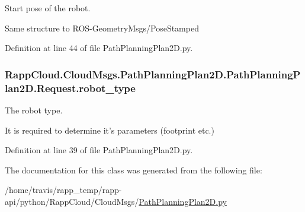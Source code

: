 Start pose of the robot. 

Same structure to R\-O\-S-\/\-Geometry\-Msgs/\-Pose\-Stamped 

Definition at line 44 of file Path\-Planning\-Plan2\-D.\-py.

\hypertarget{classRappCloud_1_1CloudMsgs_1_1PathPlanningPlan2D_1_1PathPlanningPlan2D_1_1Request_aa0e9be23584480be391095c1c64a560c}{
\subsubsection[{robot\-\_\-type}]{\setlength{\rightskip}{0pt plus 5cm}Rapp\-Cloud.\-Cloud\-Msgs.\-Path\-Planning\-Plan2\-D.\-Path\-Planning\-Plan2\-D.\-Request.\-robot\-\_\-type}}\label{classRappCloud_1_1CloudMsgs_1_1PathPlanningPlan2D_1_1PathPlanningPlan2D_1_1Request_aa0e9be23584480be391095c1c64a560c}


The robot type. 

It is required to determine it's parameters (footprint etc.) 

Definition at line 39 of file Path\-Planning\-Plan2\-D.\-py.



The documentation for this class was generated from the following file\-:\begin{DoxyCompactItemize}
\item 
/home/travis/rapp\-\_\-temp/rapp-\/api/python/\-Rapp\-Cloud/\-Cloud\-Msgs/\hyperlink{PathPlanningPlan2D_8py}{Path\-Planning\-Plan2\-D.\-py}\end{DoxyCompactItemize}
